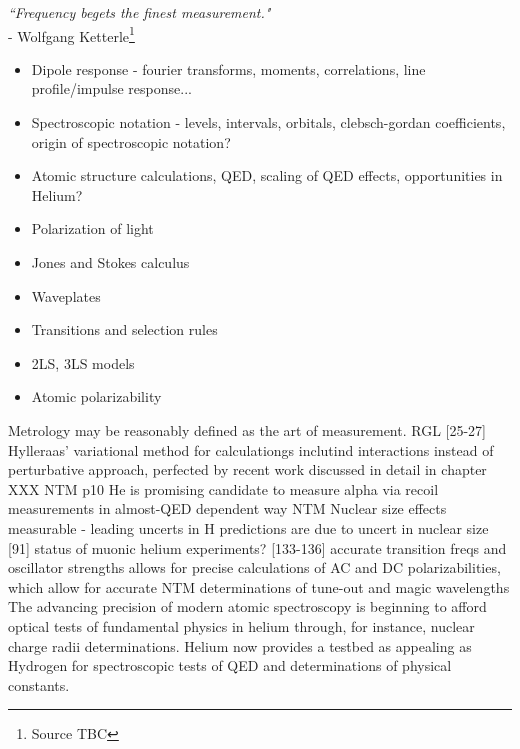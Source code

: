 \begin{adjustwidth}{4cm}{0cm}
\begin{flushright}
\emph{``Frequency begets the finest measurement."\\} 
- Wolfgang Ketterle\footnote{Source TBC}
\end{flushright}
\end{adjustwidth}






\begin{itemize}
	\item Dipole response - fourier transforms, moments, correlations, line profile/impulse response...
	\item Spectroscopic notation - levels, intervals, orbitals, clebsch-gordan coefficients, origin of spectroscopic notation?
	\item Atomic structure calculations, QED, scaling of QED effects, opportunities in Helium?
	\item Polarization of light
	\item Jones and Stokes calculus
	\item Waveplates
	\item Transitions and selection rules
	\item 2LS, 3LS models
	\item Atomic polarizability
\end{itemize}
Metrology may be reasonably defined as the art of measurement.
RGL [25-27] Hylleraas' variational method for calculationgs inclutind interactions instead of perturbative approach, perfected by recent work discussed in detail in chapter XXX
NTM p10 He is promising candidate to measure alpha via recoil measurements in almost-QED dependent way 
NTM Nuclear size effects measurable - leading uncerts in H predictions are due to uncert in nuclear size [91] 
		status of muonic helium experiments?
[133-136] accurate transition freqs and oscillator strengths allows for precise calculations of AC and DC polarizabilities, which allow for accurate NTM determinations of tune-out and magic wavelengths 
The advancing precision of modern atomic spectroscopy is beginning to afford optical tests of fundamental physics in helium through, for instance, nuclear charge radii determinations. Helium now provides a testbed as appealing as Hydrogen for spectroscopic tests of QED and determinations of physical constants. 
